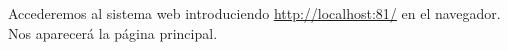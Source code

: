 \documentclass[12pt, twoside]{report}
\begin{document}

\noindent Accederemos al sistema web introduciendo \hyperlink{http://localhost:81/}{http://localhost:81/} en el navegador. Nos aparecerá la página principal.\\
\end{document}
